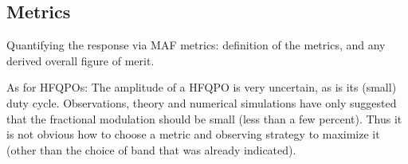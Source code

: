 


\subsection{Metrics}
\label{sec:\secname:metrics}

Quantifying the response via MAF metrics: definition of the metrics,
and any derived overall figure of merit.





As for HFQPOs: The amplitude of a HFQPO is very uncertain, as is its
(small) duty cycle. Observations, theory and numerical simulations have
only suggested that the fractional modulation should be small (less than
a few percent). Thus it is not obvious how to choose a metric and observing
strategy to maximize it (other than the choice of band that was already
indicated).


